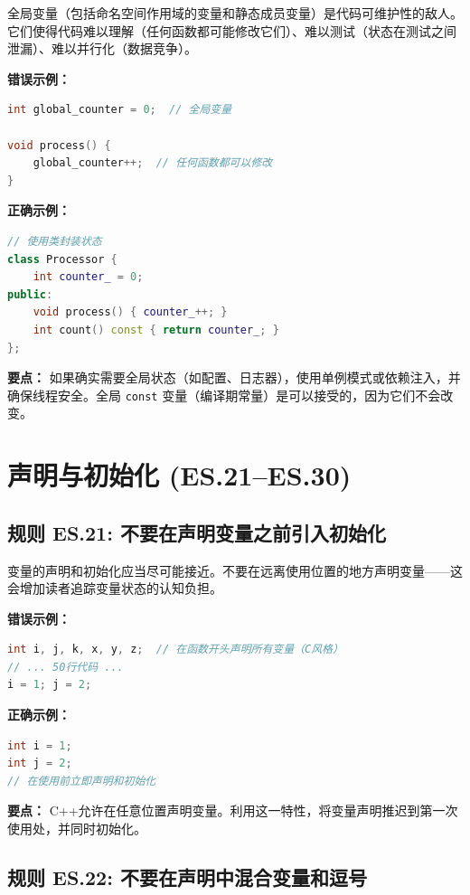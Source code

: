 全局变量（包括命名空间作用域的变量和静态成员变量）是代码可维护性的敌人。它们使得代码难以理解（任何函数都可能修改它们）、难以测试（状态在测试之间泄漏）、难以并行化（数据竞争）。

\textbf{错误示例：}

\begin{lstlisting}[language=C++]
int global_counter = 0;  // 全局变量

void process() {
    global_counter++;  // 任何函数都可以修改
}
\end{lstlisting}

\textbf{正确示例：}

\begin{lstlisting}[language=C++]
// 使用类封装状态
class Processor {
    int counter_ = 0;
public:
    void process() { counter_++; }
    int count() const { return counter_; }
};
\end{lstlisting}

\textbf{要点：} 如果确实需要全局状态（如配置、日志器），使用单例模式或依赖注入，并确保线程安全。全局 \texttt{const} 变量（编译期常量）是可以接受的，因为它们不会改变。

\section{声明与初始化 (ES.21--ES.30)}

\subsection*{\textbf{规则 ES.21:} 不要在声明变量之前引入初始化}

变量的声明和初始化应当尽可能接近。不要在远离使用位置的地方声明变量——这会增加读者追踪变量状态的认知负担。

\textbf{错误示例：}

\begin{lstlisting}[language=C++]
int i, j, k, x, y, z;  // 在函数开头声明所有变量（C风格）
// ... 50行代码 ...
i = 1; j = 2;
\end{lstlisting}

\textbf{正确示例：}

\begin{lstlisting}[language=C++]
int i = 1;
int j = 2;
// 在使用前立即声明和初始化
\end{lstlisting}

\textbf{要点：} C++允许在任意位置声明变量。利用这一特性，将变量声明推迟到第一次使用处，并同时初始化。

\subsection*{\textbf{规则 ES.22:} 不要在声明中混合变量和逗号}

